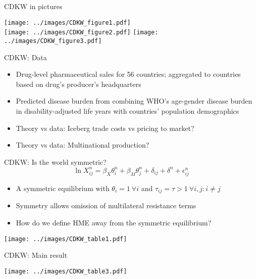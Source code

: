 \documentclass[10pt,notes=hide]{beamer}
\begin{document}
\begin{frame}{CDKW in pictures}
\begin{center}
\texttt{[image: ../images/CDKW\_figure1.pdf]}\\
\texttt{[image: ../images/CDKW\_figure2.pdf]}
\texttt{[image: ../images/CDKW\_figure3.pdf]}
\end{center}
\end{frame}
\begin{frame}{CDKW: Data}
\begin{itemize}
	\item Drug-level pharmaceutical sales for 56 countries; aggregated to countries based on drug's producer's headquarters
	\item Predicted disease burden from combining WHO's age-gender disease burden in disability-adjusted life years with countries' population demographics
	\item Theory vs data: Iceberg trade costs vs pricing to market?
	\item Theory vs data: Multinational production?
\end{itemize}
\end{frame}
\begin{frame}{CDKW: Is the world symmetric?}
\begin{equation*}
	\ln X_{ij}^n = \beta_X \theta_i^n + \beta_M \theta_j^n +  \delta_{ij} + \delta^n + \epsilon_{ij}^n
\end{equation*}
\begin{itemize}
	\item A symmetric equilibrium with $\theta_i = 1 \ \forall i$ and $\tau_{ij} = \tau > 1 \ \forall i,j:i \neq j$
	\item Symmetry allows omission of multilateral resistance terms
	\item How do we define HME away from the symmetric equilibrium?
\end{itemize}
\begin{center}\texttt{[image: ../images/CDKW\_table1.pdf]}\end{center}
\end{frame}
\begin{frame}{CDKW: Main result}
\begin{center}\texttt{[image: ../images/CDKW\_table3.pdf]}\end{center}
\end{frame}
\end{document}
